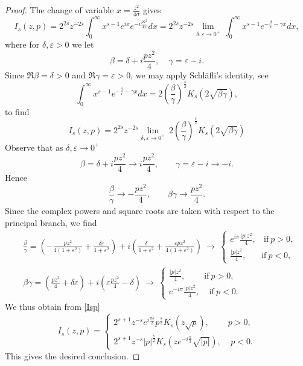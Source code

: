 \documentclass[11pt,letter]{amsart}
\numberwithin{equation}{section}
\newcommand{\ve}{\varepsilon}
\numberwithin{equation}{section}
\begin{document}
\begin{proof}
The change of variable $x = \frac{z^2}{4\sigma}$ gives
\[
I_s(z,p) = 2^{2s}z^{-2s} \int_0^\infty x^{s-1} e^{ix} e^{-i\frac{pz^2}{4x}} dx = 2^{2s}z^{-2s} \underset{\delta, \ve\to 0^+}{\lim}\ \int_0^\infty x^{s-1} e^{-\frac{\beta}x - \gamma x} dx,
\]
where for $\delta, \ve>0$ we let
\[
\beta = \delta + i \frac{p z^2}{4},\ \ \ \ \ \gamma = \ve - i.
\]
Since $\Re\beta=\delta>0$ and $\Re\gamma=\varepsilon>0$, we may apply Schl\"afli's identity, see \cite[9., 3.471]{GR}
\begin{equation}\label{reg}
\int_0^\infty x^{s-1} e^{-\frac{\beta}{x} - \gamma x} dx = 2 \left(\frac{\beta}{\gamma}\right)^{\frac s2} K_s(2\sqrt{\beta \gamma}),
\end{equation}
to find
\begin{equation}\label{Isp}
I_s(z,p) =  2^{2s}z^{-2s} \underset{\delta, \ve\to 0^+}{\lim}\ 2 \left(\frac{\beta}{\gamma}\right)^{\frac s2} K_s(2\sqrt{\beta \gamma})
\end{equation}
Observe that as $\delta,\ve \to 0^+$
\[
\beta=\delta+i\frac{pz^2}{4}\longrightarrow i\frac{pz^2}{4},
\qquad
\gamma=\ve-i\longrightarrow -i.
\]
Hence
\[
\frac{\beta}{\gamma}
\longrightarrow
-\frac{pz^2}{4},
\qquad
\beta\gamma
\longrightarrow
\frac{pz^2}{4}.
\]
Since the complex powers and square roots are taken with respect to the principal branch, we find 
\begin{align*}
& \frac \beta{\gamma} = \left(-\frac{pz^2}{4(1+\ve^2)} + \frac{\delta \ve}{1+\ve^2}\right) + i \left(\frac{\delta}{1+\ve^2} + \frac{\ve p z^2}{4(1+\ve^2)}\right)\ \longrightarrow\ \begin{cases} e^{i\pi} \frac{|p| z^2}4,\ \ \ \ \text{if}\ p>0,
\\
\frac{|p| z^2}4,\ \ \ \ \ \ \ \ \text{if}\ p<0,
\end{cases}
\\
& \beta \gamma = \left(\frac{pz^2}{4} +\delta \ve\right) + i \left(\ve \frac{pz^2}{4}- \delta\right)\ \longrightarrow\ \begin{cases}  \frac{|p| z^2}4,\ \ \ \ \ \ \ \ \ \ \text{if}\ p>0,
\\
e^{-i\pi} \frac{|p| z^2}4,\ \ \ \ \ \text{if}\ p<0.
\end{cases}
\end{align*}
We thus obtain from \eqref{Isp}
\[
I_s(z,p) = \begin{cases}
2^{s+1}z^{-s} e^{i \frac{\pi s}2} p^{\frac s2} K_s(z \sqrt{p}),\ \ \ \ \ \ \ \ \ \ p>0,
\\
2^{s+1}z^{-s}  |p|^{\frac s2} K_s(z e^{-i \frac{\pi }2}\sqrt{|p|}),\ \ \ \ \ p<0.
\end{cases}
\]
This gives the desired conclusion.

\end{proof}
\end{document}
